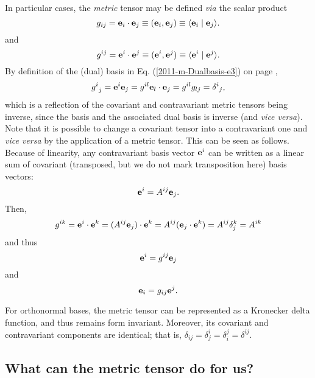 In particular cases, the {\em metric} tensor may be defined {\it via}  the scalar product
\begin{equation}
g_{ij}={\bf e}_i\cdot {\bf e}_j\equiv ({\bf e}_i, {\bf e}_j)\equiv \langle {\bf e}_i \mid {\bf e}_j\rangle .
\end{equation}
and
\begin{equation}
g^{ij}={\bf e}^i\cdot {\bf e}^j\equiv ({\bf e}^i, {\bf e}^j)\equiv \langle {\bf e}^i \mid {\bf e}^j\rangle .
\end{equation}
By definition of the (dual) basis in Eq. (\ref{2011-m-Dualbasis-e3}) on page \pageref{2011-m-Dualbasis-e3},
\begin{equation}
{g^i}_{j}
= {\bf e}^i  {\bf e}_j
= g^{il}{\bf e}_l \cdot {\bf e}_j
=g^{il}g_{lj}
={\delta^i}_j ,
\end{equation}
which is a reflection of the covariant and contravariant metric tensors being inverse,
since the basis and the associated dual basis is inverse (and {\it vice versa}).
Note that it is possible to change a covariant tensor into a contravariant one and {\em vice versa}
by the application of a metric tensor.
This can be seen as follows.
Because of linearity, any contravariant basis vector ${\bf e}^i$
can be written as a linear sum of covariant (transposed, but we do not mark transposition here) basis vectors:
\begin{equation}
{\bf e}^i=A^{ij}{\bf e}_j.
\end{equation}
Then,
\begin{equation}
g^{ik} ={\bf e}^i\cdot {\bf e}^k =(A^{ij}{\bf e}_j)\cdot {\bf e}^k=A^{ij}({\bf e}_j\cdot {\bf e}^k)=A^{ij}\delta_j^k=A^{ik}
\end{equation}
and thus
\begin{equation}
{\bf e}^i=g^{ij}{\bf e}_j
\end{equation}
and
\begin{equation}
{\bf e}_i=g_{ij}{\bf e}^j.
\end{equation}


For orthonormal bases, the metric tensor can be
represented as a Kronecker delta function, and thus  remains form invariant.
Moreover, its covariant and contravariant components are identical; that is,
$\delta_{ij}=\delta^i_j=\delta_i^j=\delta^{ij}$.



\subsection{What can the metric tensor do for us?}

